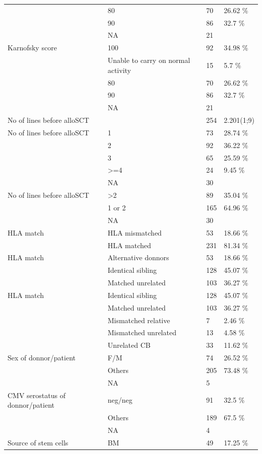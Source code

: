 \documentclass[a4paper,11pt] {article}
\begin{document}
\begin{longtable}{llll}
   & 80 & 70 & 26.62 \% \\ 
   & 90 & 86 & 32.7 \% \\ 
   & NA & 21 &  \\ 
  Karnofsky score & 100 & 92 & 34.98 \% \\ 
   & Unable to carry on normal activity & 15 & 5.7 \% \\ 
   & 80 & 70 & 26.62 \% \\ 
   & 90 & 86 & 32.7 \% \\ 
   & NA & 21 &  \\ 
  No of lines before alloSCT &  & 254 & 2.201(1;9) \\ 
  No of lines before alloSCT & 1 & 73 & 28.74 \% \\ 
   & 2 & 92 & 36.22 \% \\ 
   & 3 & 65 & 25.59 \% \\ 
   & >=4 & 24 & 9.45 \% \\ 
   & NA & 30 &  \\ 
  No of lines before alloSCT & >2 & 89 & 35.04 \% \\ 
   & 1 or 2 & 165 & 64.96 \% \\ 
   & NA & 30 &  \\ 
  HLA match & HLA mismatched & 53 & 18.66 \% \\ 
   & HLA matched & 231 & 81.34 \% \\ 
  HLA match & Alternative donnors & 53 & 18.66 \% \\ 
   & Identical sibling & 128 & 45.07 \% \\ 
   & Matched unrelated & 103 & 36.27 \% \\ 
  HLA match & Identical sibling & 128 & 45.07 \% \\ 
   & Matched unrelated & 103 & 36.27 \% \\ 
   & Mismatched relative & 7 & 2.46 \% \\ 
   & Mismatched unrelated & 13 & 4.58 \% \\ 
   & Unrelated CB & 33 & 11.62 \% \\ 
  Sex of donnor/patient & F/M & 74 & 26.52 \% \\ 
   & Others & 205 & 73.48 \% \\ 
   & NA & 5 &  \\ 
  CMV serostatus of donnor/patient & neg/neg & 91 & 32.5 \% \\ 
   & Others & 189 & 67.5 \% \\ 
   & NA & 4 &  \\ 
  Source of stem cells & BM & 49 & 17.25 \% \\ 

\end{longtable}
\end{document}
